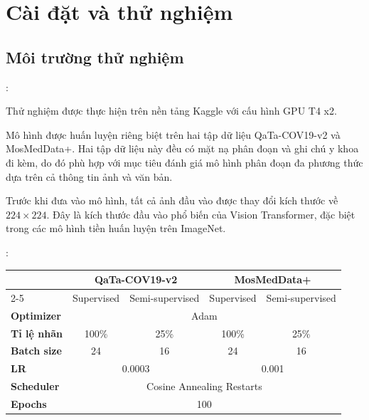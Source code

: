 \section{Cài đặt và thử nghiệm}

\subsection{Môi trường thử nghiệm}
\begin{frame}{\secname: \subsecname}

    Thử nghiệm được thực hiện trên nền tảng Kaggle với cấu hình GPU T4 x2.

    \bigskip
    Mô hình được huấn luyện riêng biệt trên hai tập dữ liệu QaTa-COV19-v2 và MosMedData+. Hai tập dữ liệu này đều có mặt nạ phân đoạn và ghi chú y khoa đi kèm, do đó phù hợp với mục tiêu đánh giá mô hình phân đoạn đa phương thức dựa trên cả thông tin ảnh và văn bản.

    \bigskip
    Trước khi đưa vào mô hình, tất cả ảnh đầu vào được thay đổi kích thước về $224 \times 224$. Đây là kích thước đầu vào phổ biến của Vision Transformer, đặc biệt trong các mô hình tiền huấn luyện trên ImageNet.
\end{frame}

\begin{frame}{\secname: \subsecname}

    \begin{table}[H]
        \centering
        \begin{tabular}{lcccc}
        \hline
        \multirow{2}{*}{} & \multicolumn{2}{c}{\textbf{QaTa-COV19-v2}} & \multicolumn{2}{c}{\textbf{MosMedData+}} \\
        \cline{2-5}
        & Supervised & Semi-supervised & Supervised & Semi-supervised \\
        \hline
        \textbf{Optimizer} & \multicolumn{4}{c}{Adam} \\
        \textbf{Tỉ lệ nhãn} & 100\% & 25\% & 100\% & 25\% \\
        \textbf{Batch size} & 24 & 16 & 24 & 16 \\
        \textbf{LR} & \multicolumn{2}{c}{0.0003} & \multicolumn{2}{c}{0.001} \\
        \textbf{Scheduler} & \multicolumn{4}{c}{Cosine Annealing Restarts} \\
        \textbf{Epochs} & \multicolumn{4}{c}{100} \\
        \hline
        \end{tabular}
    \end{table}
\end{frame}

